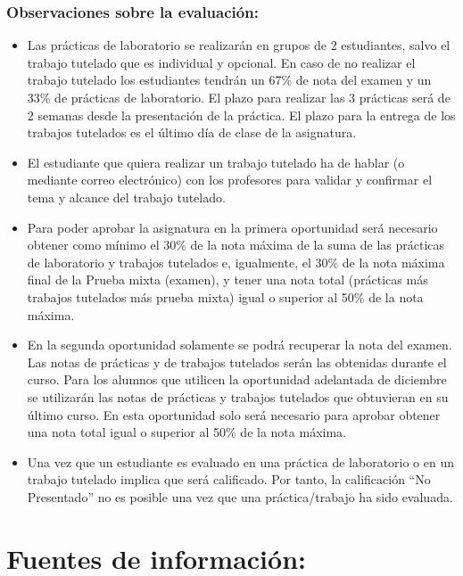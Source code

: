 \documentclass[]{book}
\begin{document}
\hypertarget{observaciones-sobre-la-evaluacion}{%
\subsubsection{Observaciones sobre la evaluación:}\label{observaciones-sobre-la-evaluacion}}

\begin{itemize}
\item
  Las prácticas de laboratorio se realizarán en grupos de 2 estudiantes, salvo el trabajo tutelado que es individual y opcional. En caso de no realizar el trabajo tutelado los estudiantes tendrán un 67\% de nota del examen y un 33\% de prácticas de laboratorio. El plazo para realizar las 3 prácticas será de 2 semanas desde la presentación de la práctica. El plazo para la entrega de los trabajos tutelados es el último día de clase de la asignatura.
\item
  El estudiante que quiera realizar un trabajo tutelado ha de hablar (o mediante correo electrónico) con los profesores para validar y confirmar el tema y alcance del trabajo tutelado.
\item
  Para poder aprobar la asignatura en la primera oportunidad será necesario obtener como mínimo el 30\% de la nota máxima de la suma de las prácticas de laboratorio y trabajos tutelados e, igualmente, el 30\% de la nota máxima final de la Prueba mixta (examen), y tener una nota total (prácticas más trabajos tutelados más prueba mixta) igual o superior al 50\% de la nota máxima.
\item
  En la segunda oportunidad solamente se podrá recuperar la nota del examen. Las notas de prácticas y de trabajos tutelados serán las obtenidas durante el curso. Para los alumnos que utilicen la oportunidad adelantada de diciembre se utilizarán las notas de prácticas y trabajos tutelados que obtuvieran en su último curso. En esta oportunidad solo será necesario para aprobar obtener una nota total igual o superior al 50\% de la nota máxima.
\item
  Una vez que un estudiante es evaluado en una práctica de laboratorio o en un trabajo tutelado implica que será calificado. Por tanto, la calificación ``No Presentado'' no es posible una vez que una práctica/trabajo ha sido evaluada.
\end{itemize}

\hypertarget{fuentes-de-informacion}{%
\section{Fuentes de información:}\label{fuentes-de-informacion}}
\end{document}
